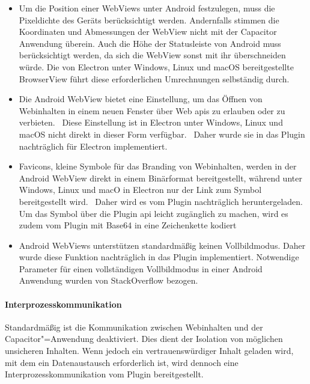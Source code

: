 \begin{itemize}
  \setlength\itemsep{-0.5em}
  \item
  Um die Position einer WebViews unter Android festzulegen, muss die Pixeldichte des Geräts berücksichtigt werden.
  Andernfalls stimmen die Koordinaten und Abmessungen der WebView nicht mit der Capacitor Anwendung überein.
  Auch die Höhe der Statusleiste von Android muss berücksichtigt werden, da sich die WebView sonst mit ihr überschneiden würde.
  Die von Electron unter Windows, Linux und macOS bereitgestellte BrowserView führt diese erforderlichen Umrechnungen selbständig durch.
  \item
  Die Android WebView bietet eine Einstellung, um das Öffnen von Webinhalten in einem neuen Fenster über Web \acp{api} zu erlauben oder zu verbieten.~\cite{android:api}
  Diese Einstellung ist in Electron unter Windows, Linux und macOS nicht direkt in dieser Form verfügbar.~\cite{electron:docs}
  Daher wurde sie in das Plugin nachträglich für Electron implementiert.
  \item
  Favicons, kleine Symbole für das Branding von Webinhalten, werden in der Android WebView direkt in einem Binärformat bereitgestellt,
  während unter Windows, Linux und macO in Electron nur der Link zum Symbol bereitgestellt wird.~\cite{android:api, electron:docs}
  Daher wird es vom Plugin nachträglich heruntergeladen.
  Um das Symbol über die Plugin \ac{api} leicht zugänglich zu machen, wird es zudem vom Plugin mit Base64 in eine Zeichenkette kodiert
  \item
  Android WebViews unterstützen standardmäßig keinen Vollbildmodus.
  Daher wurde diese Funktion nachträglich in das Plugin implementiert.
  Notwendige Parameter für einen vollständigen Vollbildmodus in einer Android Anwendung wurden von StackOverflow bezogen.
  \cite{android:api, stackoverflow}
\end{itemize}

\newpage

\paragraph{Interprozesskommunikation}

Standardmäßig ist die Kommunikation zwischen Webinhalten und der Capacitor"=Anwendung deaktiviert.
Dies dient der Isolation von möglichen unsicheren Inhalten.
Wenn jedoch ein vertrauenswürdiger Inhalt geladen wird, mit dem ein Datenaustausch erforderlich ist, wird dennoch eine Interprozesskommunikation vom Plugin bereitgestellt.

